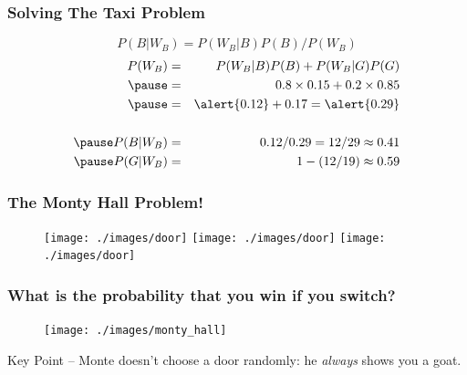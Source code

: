 \documentclass{beamer}
\begin{document}
\begin{frame}
\frametitle{Solving The Taxi Problem}
\footnotesize
{}
\normalsize

\vspace{1em}

\pause
$$P(B|W_B) = P(W_B|B)P(B)/P(W_B)$$
\pause
\begin{eqnarray*}
	P(W_B) &=& P(W_B|B) P(B) + P(W_B|G) P(G)\\ \pause
			&=& 0.8\times 0.15 + 0.2 \times 0.85 \\ \pause
			&=& \alert{0.12} + 0.17 = \alert{0.29}\\ \\ \pause
		P(B|W_B) &=& 0.12/0.29 = 12/29 \approx 0.41\\ \pause
		P(G|W_B) &=& 1 - (12/19) \approx 0.59 
	\end{eqnarray*}

\end{frame}

\begin{frame}
\frametitle{The Monty Hall Problem!}
\begin{figure}
\texttt{[image: ./images/door]}
\texttt{[image: ./images/door]}
\texttt{[image: ./images/door]}
\end{figure}
\begin{figure}
	\hspace{0.5em}
	\hspace{0.5em}
\end{figure}
\end{frame}


\begin{frame}
\frametitle{What is the probability that you win if you switch? }
\begin{figure}
\centering
	\texttt{[image: ./images/monty\_hall]}
\end{figure}
\end{frame}

\begin{frame}

\Huge Key Point -- Monte doesn't choose a door randomly: he \emph{always} shows you a goat.

\end{frame}
\end{document}
